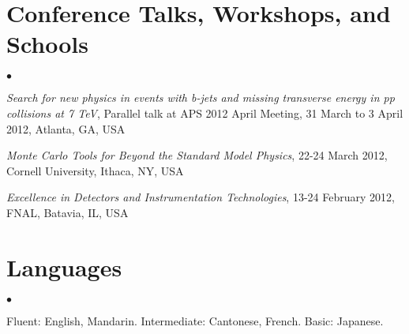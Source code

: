 \documentclass[margin,line]{res}
\newenvironment{list2}{
  \begin{list}{$\bullet$}{%
      \setlength{\itemsep}{0in}
      \setlength{\parsep}{0in} \setlength{\parskip}{0in}
      \setlength{\topsep}{0in} \setlength{\partopsep}{0in} 
      \setlength{\leftmargin}{0.2in}}}{\end{list}}
\begin{document}
\begin{resume}




\section{\sc Conference Talks, Workshops, and Schools}
\begin{list2}
\item \textit{Search for new physics in events with b-jets and missing transverse energy in pp collisions at 7 TeV}, Parallel talk at APS 2012 April Meeting, 31 March to 3 April 2012, Atlanta, GA, USA
\item \textit{Monte Carlo Tools for Beyond the Standard Model Physics}, 22-24 March 2012, Cornell University, Ithaca, NY, USA
\item \textit{Excellence in Detectors and Instrumentation Technologies}, 13-24 February 2012, FNAL, Batavia, IL, USA
\end{list2}

\section{\sc Languages}
\begin{list2}
\item Fluent: English, Mandarin. Intermediate: Cantonese, French.  Basic: Japanese.
\end{list2}


\end{resume}
\end{document}
